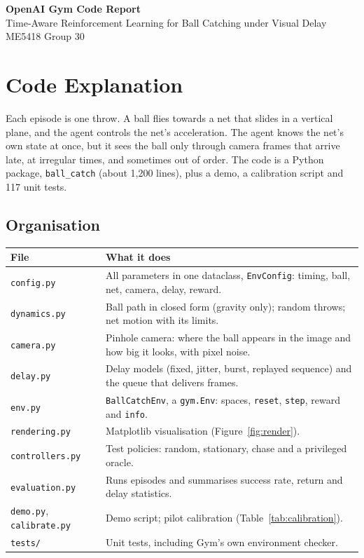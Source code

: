 \documentclass[10pt,a4paper]{article}
\newcommand{\code}[1]{\texttt{#1}}
\begin{document}
\begin{center}
  {\Large\bfseries OpenAI Gym Code Report}\\[3pt]
  Time-Aware Reinforcement Learning for Ball Catching under Visual Delay\\[2pt]
  ME5418 Group 30
\end{center}

\section{Code Explanation}

Each episode is one throw. A ball flies towards a net that slides in a vertical plane, and the agent
controls the net's acceleration. The agent knows the net's own state at once, but it sees the ball only
through camera frames that arrive late, at irregular times, and sometimes out of order.
The code is a Python package, \code{ball\_catch} (about 1,200 lines), plus a demo, a calibration
script and 117 unit tests.

\subsection{Organisation}

\begin{tabularx}{\textwidth}{@{}lX@{}}
  \toprule
  File & What it does \\
  \midrule
  \code{config.py}      & All parameters in one dataclass, \code{EnvConfig}: timing, ball, net, camera, delay, reward. \\
  \code{dynamics.py}    & Ball path in closed form (gravity only); random throws; net motion with its limits. \\
  \code{camera.py}      & Pinhole camera: where the ball appears in the image and how big it looks, with pixel noise. \\
  \code{delay.py}       & Delay models (fixed, jitter, burst, replayed sequence) and the queue that delivers frames. \\
  \code{env.py}         & \code{BallCatchEnv}, a \code{gym.Env}: spaces, \code{reset}, \code{step}, reward and \code{info}. \\
  \code{rendering.py}   & Matplotlib visualisation (Figure~\ref{fig:render}). \\
  \code{controllers.py} & Test policies: random, stationary, chase and a privileged oracle. \\
  \code{evaluation.py}  & Runs episodes and summarises success rate, return and delay statistics. \\
  \code{demo.py}, \code{calibrate.py} & Demo script; pilot calibration (Table~\ref{tab:calibration}). \\
  \code{tests/}         & Unit tests, including Gym's own environment checker. \\
  \bottomrule
\end{tabularx}
\end{document}
